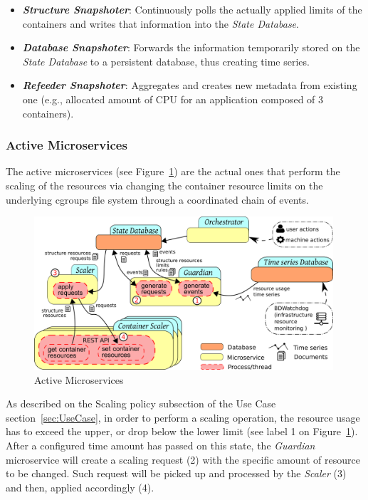 \documentclass[12pt]{article}
\begin{document}
\begin{itemize}
	\item \textbf{\textit{Structure Snapshoter}}: Continuously polls the actually applied limits of the containers and writes that information into the \textit{State Database}.
	\item \textbf{\textit{Database Snapshoter}}: Forwards the information temporarily stored on the \textit{State Database} to a persistent database, thus creating time series.
	\item \textbf{\textit{Refeeder Snapshoter}}: Aggregates and creates new metadata from existing one (e.g., allocated amount of CPU for an application composed of 3 containers).
\end{itemize}


\subsubsection{Active Microservices}

The active microservices (see Figure~\ref{fig:ActiveMicroservices}) are the actual ones that perform the scaling of the resources via changing the container resource limits on the underlying cgroups file system through a coordinated chain of events.

\begin{figure}[!tb]
	\centering
	\includegraphics[width=0.99\textwidth]{../img/architecture/active_services.png}
	\caption{Active Microservices}
	\label{fig:ActiveMicroservices}
\end{figure}

As described on the Scaling policy subsection of the Use Case section~\ref{sec:UseCase}, in order to perform a scaling operation, the resource usage has to exceed the upper, or drop below the lower limit (see label 1 on Figure~\ref{fig:ActiveMicroservices}). After a configured time amount has passed on this state, the \textit{Guardian} microservice will create a scaling request (2) with the specific amount of resource to be changed. Such request will be picked up and processed by the \textit{Scaler} (3) and then, applied accordingly (4).
\end{document}
